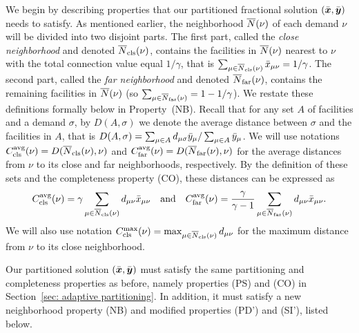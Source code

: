 We begin by describing properties that our partitioned fractional
solution $(\bar{\boldsymbol{x}},\bar{\boldsymbol{y}})$ needs to satisfy. As mentioned earlier, the neighborhood
${\overline{N}}(\nu)$ of each demand $\nu$ will be divided into two disjoint
parts.  The first part, called the \emph{close neighborhood} and denoted
${\overline{N}}_{\text{cls}}(\nu)$, contains the facilities in ${\overline{N}}(\nu)$ nearest to
$\nu$ with the total connection value equal $1/\gamma$, that is
$\sum_{\mu\in{\overline{N}}_{\text{cls}}(\nu)} {\bar x}_{\mu\nu} = 1/\gamma$.
The second
part, called the \emph{far neighborhood} and denoted ${\overline{N}}_{\text{far}}(\nu)$, contains
the remaining facilities in ${\overline{N}}(\nu)$ (so $\sum_{\mu\in{\overline{N}}_{\text{far}}(\nu)} = 1-1/\gamma$).
We restate these definitions formally below in Property~(NB).  
Recall that for any set $A$ of facilities and a demand $\sigma$, by 
$D(A,\sigma)$ we denote the average distance between $\sigma$ and the facilities in $A$, that is
$D(A,\sigma) =\sum_{\mu\in A} d_{\mu\sigma}{\bar y}_{\mu}/\sum_{\mu\in A} {\bar y}_{\mu}$.
We will use notations
$C_{\text{cls}}^{{\mbox{\scriptsize\rm avg}}}(\nu)=D({\overline{N}}_{\text{cls}}(\nu),\nu)$ and
$C_{\text{far}}^{{\mbox{\scriptsize\rm avg}}}(\nu)=D({\overline{N}}_{\text{far}}(\nu),\nu)$ for the
average distances from $\nu$ to its close and far neighborhoods, respectively.
By the definition of these sets and the completeness property (CO), these distances can be expressed as
%
\begin{equation*}
C_{\text{cls}}^{{\mbox{\scriptsize\rm avg}}}(\nu)=\gamma\sum_{\mu\in{\overline{N}}_{\text{cls}}(\nu)}
			d_{\mu\nu}{\bar x}_{\mu\nu} \quad\text{and}\quad
C_{\text{far}}^{{\mbox{\scriptsize\rm avg}}}(\nu)=\frac{\gamma}{\gamma-1}\sum_{\mu\in{\overline{N}}_{\text{far}}(\nu)}
d_{\mu\nu}{\bar x}_{\mu\nu}. 
\end{equation*}
%
We will also use
notation $C_{\text{cls}}^{\max}(\nu)=\max_{\mu\in{\overline{N}}_{\text{cls}}(\nu)} d_{\mu\nu}$ for
the maximum distance from $\nu$ to its close neighborhood.

Our partitioned solution $(\bar{\boldsymbol{x}},\bar{\boldsymbol{y}})$ must satisfy the same
partitioning and completeness properties as before, namely properties
(PS) and (CO) in Section~\ref{sec: adaptive partitioning}.  In
addition, it must satisfy a new neighborhood property (NB) and modified
properties (PD') and (SI'), listed below.

